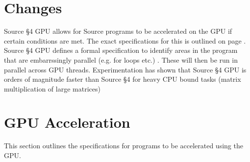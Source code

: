 





\section*{Changes}

Source \S 4 GPU allows for Source programs to be accelerated on the GPU if certain conditions are met.
The exact specifications for this is outlined on page \pageref{gpu_supp}. Source \S 4 GPU  defines a formal specification 
to identify areas in the program that are embarrssingly parallel (e.g. for loops etc.) . These will then
be run in parallel across GPU threads. Experimentation has shown that Source \S 4 GPU is orders of magnitude faster
than Source \S 4 for heavy CPU bound tasks (matrix multiplication of large matrices)





\newpage































\newpage

\section*{GPU Acceleration}
\label{gpu_supp}
This section outlines the specifications for programs to be accelerated using the GPU.\


